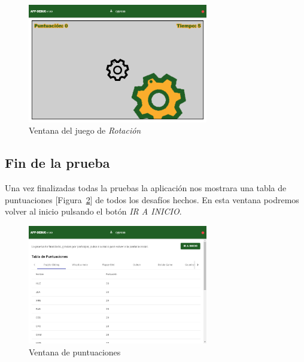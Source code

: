 \begin{figure}[!h]
    \centering
    \includegraphics[width=0.7\textwidth, keepaspectratio]{imaxes/application/rotate-page.png}
    \caption{Ventana del juego de \textit{Rotación}}
    \label{fig:rotate_page}
\end{figure}


\subsection{Fin de la prueba}
Una vez finalizadas todas la pruebas la aplicación nos mostrara una tabla de puntuaciones [Figura~\ref{fig:score_page}] de todos los desafíos hechos. En esta ventana podremos volver al inicio pulsando el botón \textit{IR A INICIO}.

\begin{figure}[!h]
    \centering
    \includegraphics[width=0.7\textwidth, keepaspectratio]{imaxes/application/score-page.png}
    \caption{Ventana de puntuaciones}
    \label{fig:score_page}
\end{figure}